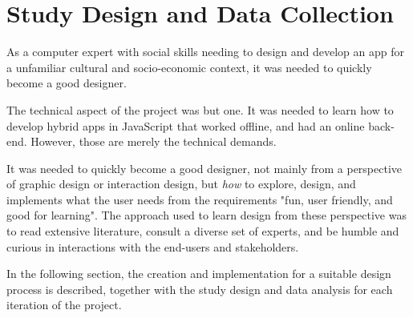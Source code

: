 \section{Study Design and Data Collection}

  As a computer expert with social skills needing to design and develop an app for a unfamiliar cultural and socio-economic context, it was needed to quickly become a good designer.

  The technical aspect of the project was but one. It was needed to learn how to develop hybrid apps in JavaScript that worked offline, and had an online back-end. However, those are merely the technical demands.

  It was needed to quickly become a good designer, not mainly from a perspective of graphic design or interaction design, but \textit{how} to explore, design, and implements what the user needs from the requirements "fun, user friendly, and good for learning". The approach used to learn design from these perspective was to read extensive literature, consult a diverse set of experts, and be humble and curious in interactions with the end-users and stakeholders.

  In the following section, the creation and implementation for a suitable design process is described, together with the study design and data analysis for each iteration of the project.










